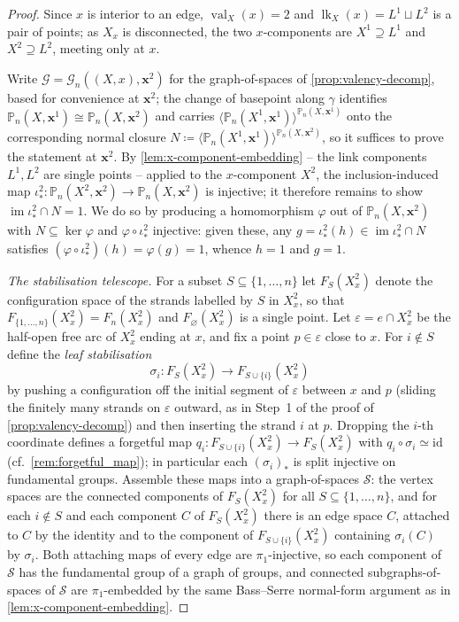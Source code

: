 \documentclass[reqno]{amsart}
\theoremstyle{definition}
\newcommand\bfx{\mathbf{x}}
\newcommand\cG{\mathcal{G}}
\newcommand\cS{\mathcal{S}}
\newcommand{\PB}{\mathbb{P}}
\newcommand{\im}{\operatorname{im}}
\newcommand{\co}[1]{\mathopen{\langle}#1\mathclose{\rangle}} %
\DeclareMathOperator{\lk}{lk}
\DeclareMathOperator{\val}{val}
\numberwithin{equation}{section}
\begin{document}
\begin{proof}
Since \(x\) is interior to an edge, \(\val_X(x)=2\) and
\(\lk_X(x)=L^1\sqcup L^2\) is a pair of points; as \(X_x\) is
disconnected, the two \(x\)-components are \(X^1\supseteq L^1\) and
\(X^2\supseteq L^2\), meeting only at \(x\).

Write \(\cG=\cG_n((X,x),\bfx^2)\) for the graph-of-spaces of
\cref{prop:valency-decomp}, based for convenience at \(\bfx^2\); the
change of basepoint along \(\gamma\) identifies
\(\PB_n(X,\bfx^1)\cong\PB_n(X,\bfx^2)\) and carries
\(\co{\PB_n(X^1,\bfx^1)}^{\PB_n(X,\bfx^1)}\) onto the corresponding
normal closure
\(N\coloneqq\co{\PB_n(X^1,\bfx^1)}^{\PB_n(X,\bfx^2)}\), so it
suffices to prove the statement at \(\bfx^2\). By
\cref{lem:x-component-embedding} -- the link components
\(L^1,L^2\) are single points -- applied to the \(x\)-component
\(X^2\), the inclusion-induced map
\(\iota^2_\ast\colon\PB_n(X^2,\bfx^2)\to\PB_n(X,\bfx^2)\) is
injective; it therefore remains to show
\(\im\iota^2_\ast\cap N=1\). We do so by producing a homomorphism
\(\varphi\) out of \(\PB_n(X,\bfx^2)\) with
\(N\subseteq\ker\varphi\) and \(\varphi\circ\iota^2_\ast\)
injective: given these, any
\(g=\iota^2_\ast(h)\in\im\iota^2_\ast\cap N\) satisfies
\((\varphi\circ\iota^2_\ast)(h)=\varphi(g)=1\), whence \(h=1\) and
\(g=1\).

\smallskip
\noindent\emph{The stabilisation telescope.}
For a subset \(S\subseteq\{1,\dots,n\}\) let \(F_S(X^2_x)\) denote
the configuration space of the strands labelled by \(S\) in
\(X^2_x\), so that \(F_{\{1,\dots,n\}}(X^2_x)=F_n(X^2_x)\) and
\(F_\varnothing(X^2_x)\) is a single point. Let
\(\varepsilon=e\cap X^2_x\) be the half-open free arc of \(X^2_x\)
ending at \(x\), and fix a point \(p\in\varepsilon\) close to
\(x\). For \(i\notin S\) define the \emph{leaf stabilisation}
\[
\sigma_i\colon F_S(X^2_x)\longrightarrow F_{S\cup\{i\}}(X^2_x)
\]
by pushing a configuration off the initial segment of
\(\varepsilon\) between \(x\) and \(p\) (sliding the finitely many
strands on \(\varepsilon\) outward, as in Step~1 of the proof of
\cref{prop:valency-decomp}) and then inserting the strand \(i\) at
\(p\). Dropping the \(i\)-th coordinate defines a forgetful map
\(q_i\colon F_{S\cup\{i\}}(X^2_x)\to F_S(X^2_x)\) with
\(q_i\circ\sigma_i\simeq\mathrm{id}\)
(cf.\ \cref{rem:forgetful_map}); in particular each
\((\sigma_i)_\ast\) is split injective on fundamental groups.
Assemble these maps into a graph-of-spaces \(\cS\): the vertex
spaces are the connected components of \(F_S(X^2_x)\) for all
\(S\subseteq\{1,\dots,n\}\), and for each \(i\notin S\) and each
component \(C\) of \(F_S(X^2_x)\) there is an edge space \(C\),
attached to \(C\) by the identity and to the component of
\(F_{S\cup\{i\}}(X^2_x)\) containing \(\sigma_i(C)\) by
\(\sigma_i\). Both attaching maps of every edge are
\(\pi_1\)-injective, so each component of \(\cS\) has the
fundamental group of a graph of groups, and connected
subgraphs-of-spaces of \(\cS\) are \(\pi_1\)-embedded by the same
Bass--Serre normal-form argument as in
\cref{lem:x-component-embedding}.


\end{proof}
\end{document}
